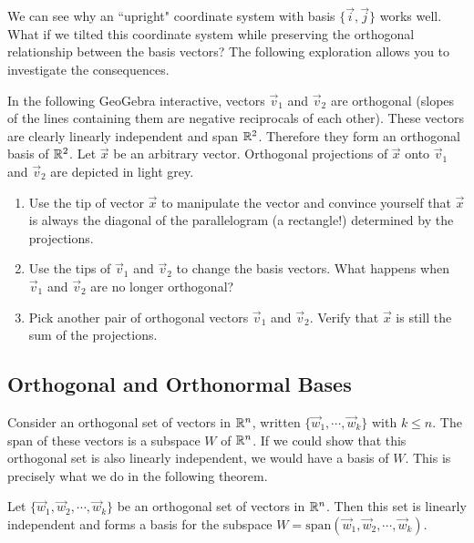 \documentclass{ximera}
\begin{document}
We can see why an ``upright" coordinate system with basis $\{\vec{i},\vec{j}\}$ works well.  What if we tilted this coordinate system while preserving the orthogonal relationship between the basis vectors?  The following exploration allows you to investigate the consequences.

\begin{exploration}\label{exp:orth1}
    In the following GeoGebra interactive, vectors $\vec{v}_1$ and $\vec{v}_2$ are orthogonal (slopes of the lines containing them are negative reciprocals of each other).  These vectors are clearly linearly independent and span $\mathbb{R}^2$.  Therefore they form an orthogonal basis of $\mathbb{R}^2$.  Let $\vec{x}$ be an arbitrary vector.  Orthogonal projections of $\vec{x}$ onto $\vec{v}_1$ and $\vec{v}_2$ are depicted in light grey.
    \begin{enumerate}
        \item Use the tip of vector $\vec{x}$ to manipulate the vector and convince yourself that $\vec{x}$ is always the diagonal of the parallelogram (a rectangle!) determined by the projections.
        \item Use the tips of $\vec{v}_1$ and $\vec{v}_2$ to change the basis vectors.  What happens when $\vec{v}_1$ and $\vec{v}_2$ are no longer orthogonal?
        \item Pick another pair of orthogonal vectors $\vec{v}_1$ and $\vec{v}_2$.  Verify that $\vec{x}$ is still the sum of the projections.
    \end{enumerate}

    \begin{center}
\end{center}
\end{exploration}

\subsection*{Orthogonal and Orthonormal Bases}
Consider an orthogonal set of vectors in $\mathbb{R}^n$, written $\{
\vec{w}_1, \cdots, \vec{w}_k \}$ with $k \leq n$. The span of these
vectors is a subspace $W$ of $\mathbb{R}^n$.   If we
could show that this orthogonal set is also linearly independent, we
would have a basis of $W$. This is precisely what we do in the following theorem.

\begin{theorem}\label{orthbasis}
Let $ \{ \vec{w}_1, \vec{w}_2, \cdots, \vec{w}_k \}$ be an
orthogonal set of vectors in $\mathbb{R}^n$. Then this set is
linearly independent and forms a basis for the subspace $W =
\mbox{span}\left( \vec{w}_1, \vec{w}_2, \cdots, \vec{w}_k \right)$.
\end{theorem}
\end{document}
